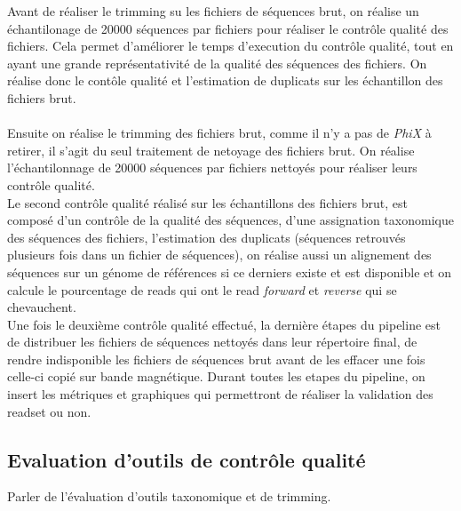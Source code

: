 Avant de réaliser le trimming su les fichiers de séquences brut, on réalise un échantilonage de 20000 séquences par fichiers pour réaliser le contrôle qualité des fichiers. Cela permet d'améliorer le temps d'execution du contrôle qualité, tout en ayant une grande représentativité de la qualité des séquences des fichiers. On réalise donc le contôle qualité et l'estimation de duplicats sur les échantillon des fichiers brut.\\\\

Ensuite on réalise le trimming des fichiers brut, comme il n'y a pas de \emph{PhiX} à retirer, il s'agit du seul traitement de netoyage des fichiers brut. On réalise l'échantilonnage de 20000 séquences par fichiers nettoyés pour réaliser leurs contrôle qualité.\\

Le second contrôle qualité réalisé sur les échantillons des fichiers brut, est composé d'un contrôle de la qualité des séquences, d'une assignation taxonomique des séquences des fichiers, l'estimation des duplicats (séquences retrouvés plusieurs fois dans un fichier de séquences), on réalise aussi un alignement des séquences sur un génome de références si ce derniers existe et est disponible et on calcule le pourcentage de reads qui ont le read \emph{forward} et \emph{reverse} qui se chevauchent.\\

Une fois le deuxième contrôle qualité effectué, la dernière étapes du pipeline est de distribuer les fichiers de séquences nettoyés dans leur répertoire final, de rendre indisponible les fichiers de séquences brut avant de les effacer une fois celle-ci copié sur bande magnétique. Durant toutes les etapes du pipeline, on insert les métriques et graphiques qui permettront de réaliser la validation des readset ou non.

\subsection{Evaluation d'outils de contrôle qualité}

Parler de l'évaluation d'outils taxonomique et de trimming.